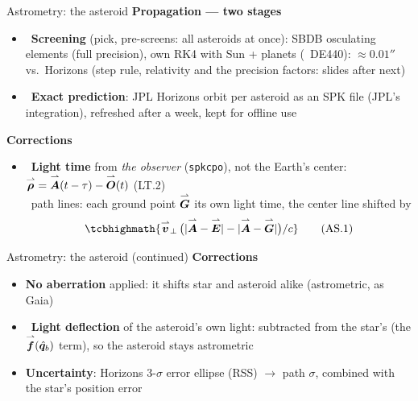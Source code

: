 \begin{frame}{Astrometry: the asteroid}
  \footnotesize\tightdisplays
  \setlength{\leftmargini}{1.4em}
  \textbf{Propagation --- two stages}
  \begin{itemize}
    \item \OWN\ \textbf{Screening} (pick, pre-screens: all asteroids at once): SBDB osculating elements
          (full precision), own RK4 with Sun + planets (\SP\ DE440): $\approx 0.01''$ vs.\ Horizons
          (step rule, relativity and the precision factors: slides after next)
    \item \SP\ \textbf{Exact prediction}: JPL Horizons orbit per asteroid as an SPK file
          (JPL's integration), refreshed after a week, kept for offline use
  \end{itemize}
  \smallskip\textbf{Corrections}
  \begin{itemize}
    \item \SP\ \textbf{Light time} from \emph{the observer} (\texttt{spkcpo}), not the Earth's center:
          $\overset{\rightharpoonup}{\bm{\rho}} = \overset{\rightharpoonup}{\bm{A}}(t-\tau) - \overset{\rightharpoonup}{\bm{O}}(t)$ (LT.2)\\
          \OWN\ path lines: each ground point $\overset{\rightharpoonup}{\bm{G}}$ its own light time, the center line shifted by
          \[
            \tcbhighmath{\vv{v}_{\perp}\,\bigl(|\vv{A} - \vv{E}| - |\vv{A} - \vv{G}|\bigr)/c}
            \tag{AS.1}
          \]
  \end{itemize}
\end{frame}

\begin{frame}{Astrometry: the asteroid (continued)}
  \footnotesize
  \setlength{\leftmargini}{1.4em}
  \textbf{Corrections}
  \begin{itemize}\setlength{\itemsep}{1ex}
    \item \textbf{No aberration} applied: it shifts star and asteroid alike (astrometric, as Gaia)
    \item \OWN\ \textbf{Light deflection} of the asteroid's own light: subtracted from the star's
          (the $\overset{\rightharpoonup}{\bm{f}}(\hat{\bm{q}}_b)$ term), so the asteroid stays astrometric
    \item \textbf{Uncertainty}: Horizons 3-$\sigma$ error ellipse (RSS) $\to$ path $\sigma$,
          combined with the star's position error
  \end{itemize}
\end{frame}

